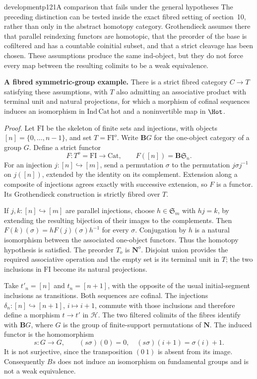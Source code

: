 \begin{dcomment}{development}{p121}{A comparison that fails under the general hypotheses}
The preceding distinction can be tested inside the exact fibred setting of section~10, rather than only in the abstract homotopy category. Grothendieck assumes there that parallel reindexing functors are homotopic, that the preorder of the base is cofiltered and has a countable coinitial subset, and that a strict cleavage has been chosen. These assumptions produce the same ind-object, but they do not force every map between the resulting colimits to be a weak equivalence.

\textbf{A fibred symmetric-group example.}\ours\quad
There is a strict fibred category $C\to T$ satisfying these assumptions, with $T$ also admitting an associative product with terminal unit and natural projections, for which a morphism of cofinal sequences induces an isomorphism in $\mathrm{Ind}\,\mathrm{Cat\,hot}$ and a noninvertible map in $\Hot$.

\textit{Proof.} Let $\mathrm{FI}$ be the skeleton of finite sets and injections, with objects $[n]=\{0,\ldots,n-1\}$, and set $T=\mathrm{FI}^o$. Write $\mathbf B G$ for the one-object category of a group $G$. Define a strict functor
\[
 F:T^o=\mathrm{FI}\longrightarrow\mathrm{Cat},\qquad
 F([n])=\mathbf B\mathfrak S_n.
\]
For an injection $j:[n]\hookrightarrow[m]$, send a permutation $\sigma$ to the permutation $j\sigma j^{-1}$ on $j([n])$, extended by the identity on its complement. Extension along a composite of injections agrees exactly with successive extension, so $F$ is a functor. Its Grothendieck construction is strictly fibred over $T$.

If $j,k:[n]\hookrightarrow[m]$ are parallel injections, choose $h\in\mathfrak S_m$ with $h j=k$, by extending the resulting bijection of their images to the complements. Then
$F(k)(\sigma)=hF(j)(\sigma)h^{-1}$ for every $\sigma$. Conjugation by $h$ is a natural isomorphism between the associated one-object functors. Thus the homotopy hypothesis is satisfied. The preorder $T_o$ is $\mathbf N^o$. Disjoint union provides the required associative operation and the empty set is its terminal unit in $T$; the two inclusions in $\mathrm{FI}$ become its natural projections.

Take $t'_n=[n]$ and $t_n=[n+1]$, with the opposite of the usual initial-segment inclusions as transitions. Both sequences are cofinal. The injections
$\delta_n:[n]\hookrightarrow[n+1]$, $i\mapsto i+1$, commute with those inclusions and therefore define a morphism $t\to t'$ in $\mathcal H$. The two filtered colimits of the fibres identify with $\mathbf B G$, where $G$ is the group of finite-support permutations of $\mathbf N$. The induced functor is the homomorphism
\[
 s:G\longrightarrow G,\qquad
 (s\sigma)(0)=0,\quad(s\sigma)(i+1)=\sigma(i)+1.
\]
It is not surjective, since the transposition $(0\ 1)$ is absent from its image. Consequently $Bs$ does not induce an isomorphism on fundamental groups and is not a weak equivalence.


\end{dcomment}
